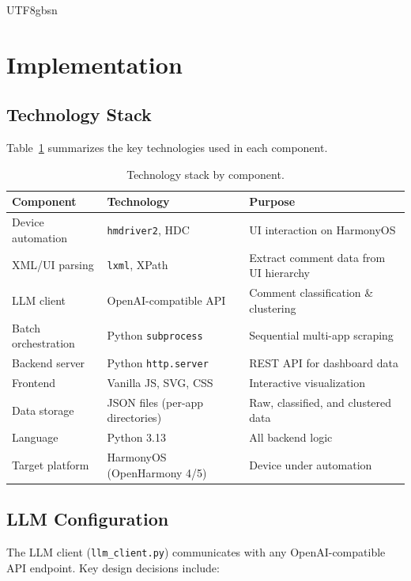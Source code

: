 \documentclass[11pt,a4paper]{article}
\begin{document}
\begin{CJK*}{UTF8}{gbsn}
\section{Implementation}

\subsection{Technology Stack}

Table~\ref{tab:stack} summarizes the key technologies used in each component.

\begin{table}[H]
\centering
\caption{Technology stack by component.}
\label{tab:stack}
\begin{tabular}{@{}lll@{}}
\toprule
\textbf{Component} & \textbf{Technology} & \textbf{Purpose} \\
\midrule
Device automation & \texttt{hmdriver2}, HDC & UI interaction on HarmonyOS \\
XML/UI parsing    & \texttt{lxml}, XPath   & Extract comment data from UI hierarchy \\
LLM client        & OpenAI-compatible API & Comment classification \& clustering \\
Batch orchestration & Python \texttt{subprocess} & Sequential multi-app scraping \\
Backend server    & Python \texttt{http.server} & REST API for dashboard data \\
Frontend          & Vanilla JS, SVG, CSS & Interactive visualization \\
Data storage      & JSON files (per-app directories) & Raw, classified, and clustered data \\
\midrule
Language          & Python 3.13           & All backend logic \\
\midrule
Target platform   & HarmonyOS (OpenHarmony 4/5) & Device under automation \\
\bottomrule
\end{tabular}
\end{table}

\subsection{LLM Configuration}

The LLM client (\texttt{llm\_client.py}) communicates with any OpenAI-compatible API endpoint. Key design decisions include:


\end{CJK*}
\end{document}
